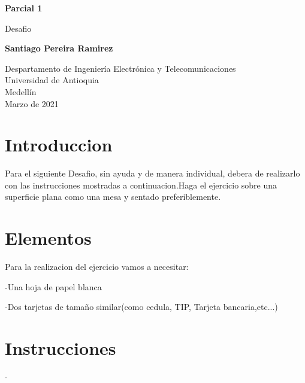\documentclass{article}
\begin{document}
\begin{titlepage}
    \begin{center}
        \vspace*{1cm}
            
        \Huge
        \textbf{Parcial 1 }
            
        \vspace{0.5cm}
        \LARGE
        Desafio
            
        \vspace{1.5cm}
            
        \textbf{Santiago Pereira Ramirez}
            
        \vfill
            
        \vspace{0.8cm}
            
        \Large
        Despartamento de Ingeniería Electrónica y Telecomunicaciones\\
        Universidad de Antioquia\\
        Medellín\\
        Marzo de 2021
            
    \end{center}
\end{titlepage}

\tableofcontents
\newpage
\section{Introduccion }\label{intro}
Para el siguiente Desafio, sin ayuda y de manera individual, debera de realizarlo con las instrucciones mostradas a continuacion.Haga el ejercicio sobre una superficie plana como una mesa y sentado preferiblemente.

\section{Elementos} \label{contenido}
Para la realizacion del ejercicio vamos a necesitar:

    -Una hoja de papel blanca
    
    -Dos tarjetas de tamaño similar(como cedula, TIP, Tarjeta bancaria,etc...)

\section{Instrucciones} \label{contenido}
    
    -



\end{document}
